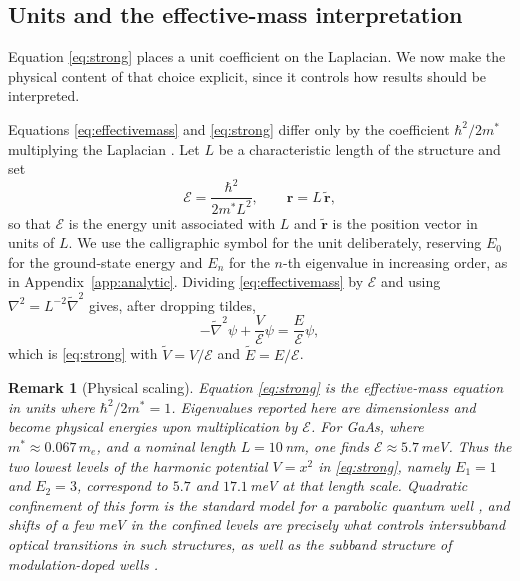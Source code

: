\documentclass[pdflatex,sn-mathphys-num]{sn-jnl}
\theoremstyle{thmstyleone}%
\theoremstyle{thmstyletwo}%
\newtheorem{remark}{Remark}%
\theoremstyle{thmstylethree}%
\begin{document}
\subsection{Units and the effective-mass interpretation}\label{sec:units}

Equation \eqref{eq:strong} places a unit coefficient on the Laplacian. We now
make the physical content of that choice explicit, since it controls how results
should be interpreted.

Equations \eqref{eq:effectivemass} and \eqref{eq:strong} differ only by the
coefficient $\hbar^2/2m^*$ multiplying the Laplacian
\cite{harrison2005,datta2005}. Let $L$ be a characteristic length of the
structure \cite{harrison2005} and set
%
\begin{equation}\label{eq:energyunit}
  \mathcal{E} = \frac{\hbar^2}{2m^*L^2}, \qquad \mathbf{r} = L\,\tilde{\mathbf{r}} ,
\end{equation}
%
so that $\mathcal{E}$ is the energy unit associated with $L$ and
$\tilde{\mathbf{r}}$ is the position vector in units of $L$. We use the
calligraphic symbol for the unit deliberately, reserving $E_0$ for the
ground-state energy and $E_n$ for the $n$-th eigenvalue in increasing order, as
in Appendix~\ref{app:analytic}.
Dividing \eqref{eq:effectivemass} by $\mathcal{E}$ and using
$\nabla^2 = L^{-2}\tilde\nabla^2$ gives, after dropping tildes,
%
\begin{equation}
  -\tilde\nabla^2\psi + \frac{V}{\mathcal{E}}\psi = \frac{E}{\mathcal{E}}\psi ,
\end{equation}
%
which is \eqref{eq:strong} with $\tilde V = V/\mathcal{E}$ and $\tilde E = E/\mathcal{E}$.

\begin{remark}[Physical scaling]\label{rem:units}
Equation \eqref{eq:strong} is the effective-mass equation in units where
$\hbar^2/2m^* = 1$. Eigenvalues reported here are dimensionless and become
physical energies upon multiplication by $\mathcal{E}$. For GaAs, where
$m^* \approx 0.067\,m_e$, and a nominal length $L = 10$\,nm, one finds
$\mathcal{E} \approx 5.7$\,meV. Thus the two lowest levels of the harmonic potential
$V = x^2$ in \eqref{eq:strong}, namely $E_1 = 1$ and $E_2 = 3$, correspond to
$5.7$ and $17.1$\,meV at that length scale. Quadratic confinement of this form
is the standard model for a parabolic quantum well
\cite{parabolic2002,harrison2005}, and shifts of a few meV in the confined
levels are precisely what controls intersubband optical transitions in such
structures, as well as the subband structure of modulation-doped wells
\cite{subband2003}.
\end{remark}
\end{document}
